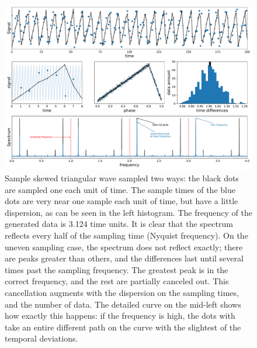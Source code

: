 \begin{figure}
	\centering
	\includegraphics[width=\textwidth]{img/uneven_advantage.pdf}
	\caption[Comparison between even and uneven sampled signal past the Nyquist limit]{
		Sample skewed triangular wave sampled two ways: the black dots are sampled one each unit of time.
		The sample times of the blue dots are very near one sample each unit of time, but have a little dispersion,
		as can be seen in the left histogram.
		The frequency of the generated data is 3.124 time units.
		It is clear that the spectrum reflects every half of the sampling time (Nyquist frequency). 
		On the uneven sampling case, the spectrum does not reflect exactly; there are peaks greater than others,
		and the differences last until several times past the sampling frequency.
		The greatest peak is in the correct frequency, and the rest are partially canceled out.
		This cancellation augments with the dispersion on the sampling times, and the number of data.
		The detailed curve on the mid-left shows how exactly this happens: if the frequency is high, 
		the dots with take an entire different path on the curve with the slightest of the temporal deviations.
	}
	\label{fig:uneven-advantage}
\end{figure}


